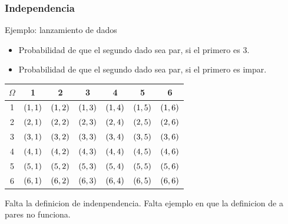 \documentclass[table]{beamer}
\begin{document}
\begin{frame}
    \frametitle{Independencia}
    \begin{block}{Ejemplo: lanzamiento de dados}
        \begin{itemize}
            \item Probabilidad de que el segundo dado sea par, si el primero es 3.
            \item Probabilidad de que el segundo dado sea par, si el primero es impar.
        \end{itemize}
    \end{block}
    \begin{center}
        \begin{tabular}{c|cccccc}
            $\Omega$ & 1 & 2 & 3 & 4 & 5 & 6 \\
            \hline
            1 & $\parens{1, 1}$ & $\parens{1, 2}$ & $\parens{1, 3}$ & $\parens{1, 4}$ & $\parens{1, 5}$ & $\parens{1, 6}$ \\
            2 & $\parens{2, 1}$ & $\parens{2, 2}$ & $\parens{2, 3}$ & $\parens{2, 4}$ & $\parens{2, 5}$ & $\parens{2, 6}$ \\
            3 & $\parens{3, 1}$ & $\parens{3, 2}$ & $\parens{3, 3}$ & $\parens{3, 4}$ & $\parens{3, 5}$ & $\parens{3, 6}$ \\
            4 & $\parens{4, 1}$ & $\parens{4, 2}$ & $\parens{4, 3}$ & $\parens{4, 4}$ & $\parens{4, 5}$ & $\parens{4, 6}$ \\
            5 & $\parens{5, 1}$ & $\parens{5, 2}$ & $\parens{5, 3}$ & $\parens{5, 4}$ & $\parens{5, 5}$ & $\parens{5, 6}$ \\
            6 & $\parens{6, 1}$ & $\parens{6, 2}$ & $\parens{6, 3}$ & $\parens{6, 4}$ & $\parens{6, 5}$ & $\parens{6, 6}$ \\
        \end{tabular}
    \end{center}
\end{frame}

\begin{frame}
Falta la definicion de indenpendencia.
Falta ejemplo en que la definicion de a pares no funciona.
\end{frame}
\end{document}
